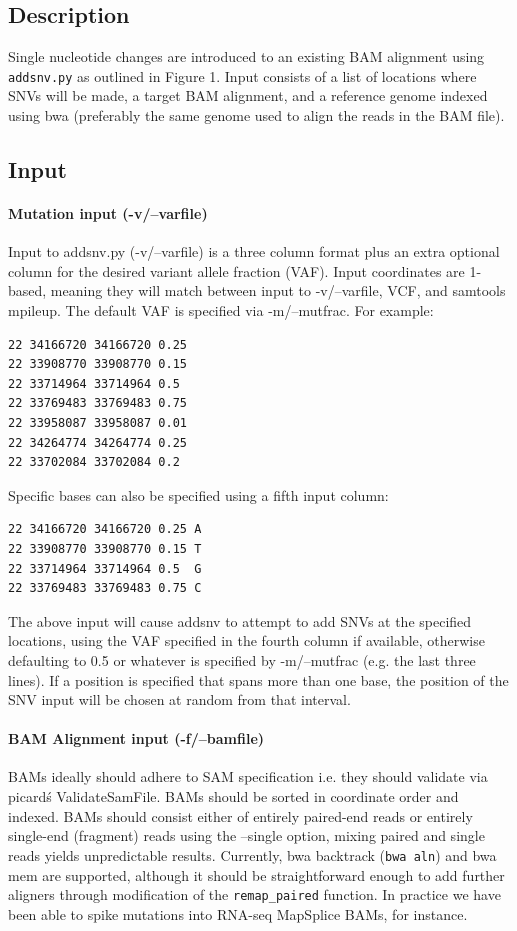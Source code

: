 \documentclass[letterpaper,11pt]{article}
\begin{document}
\subsection{Description}
    Single nucleotide changes are introduced to an existing BAM alignment using \texttt {addsnv.py} as outlined in Figure 1. Input consists of a list of locations where SNVs will be made, a target BAM alignment, and a reference genome indexed using bwa (preferably the same genome used to align the reads in the BAM file). 

\subsection{Input}
\paragraph{Mutation input (-v/--varfile)}
	Input to addsnv.py (-v/--varfile) is a three column format plus an extra optional column for the desired variant allele fraction (VAF). Input coordinates are 1-based, meaning they will match between input to -v/--varfile, VCF, and samtools mpileup. The default VAF is specified via -m/--mutfrac. For example:
\begin{verbatim}
22 34166720 34166720 0.25
22 33908770 33908770 0.15
22 33714964 33714964 0.5
22 33769483 33769483 0.75
22 33958087 33958087 0.01
22 34264774 34264774 0.25
22 33702084 33702084 0.2
\end{verbatim}

Specific bases can also be specified using a fifth input column:
\begin{verbatim}
22 34166720 34166720 0.25 A
22 33908770 33908770 0.15 T
22 33714964 33714964 0.5  G
22 33769483 33769483 0.75 C
\end{verbatim}

    The above input will cause addsnv to attempt to add SNVs at the specified locations, using the VAF specified in the fourth column if available, otherwise defaulting to 0.5 or whatever is specified by -m/--mutfrac (e.g. the last three lines). If a position is specified that spans more than one base, the position of the SNV input will be chosen at random from that interval.

\paragraph{BAM Alignment input (-f/--bamfile)}
	BAMs ideally should adhere to SAM specification i.e. they should validate via picard\'s ValidateSamFile. BAMs should be sorted in coordinate order and indexed. BAMs should consist either of entirely paired-end reads or entirely single-end (fragment) reads using the --single option, mixing paired and single reads yields unpredictable results. Currently, bwa backtrack (\texttt{bwa aln}) and bwa mem are supported, although it should be straightforward enough to add further aligners through modification of the \texttt{remap\_paired} function. In practice we have been able to spike mutations into RNA-seq MapSplice BAMs, for instance.
\end{document}
